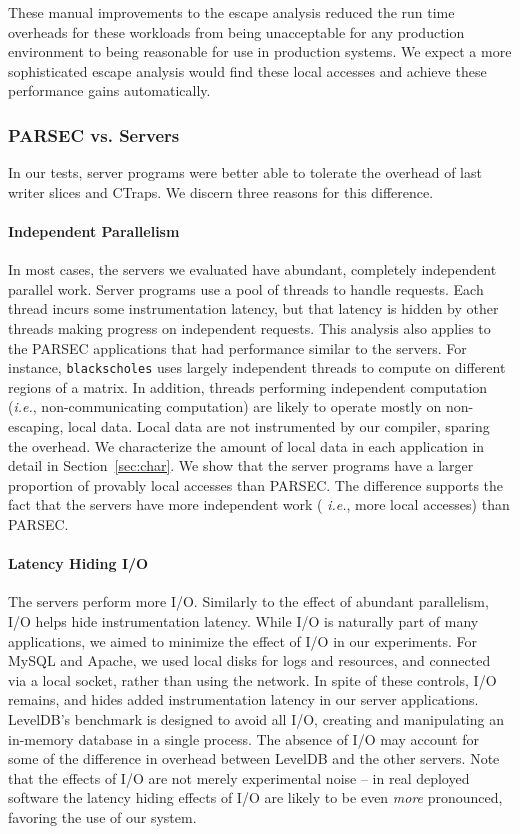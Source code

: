 \documentclass[preprint,9pt]{sigplanconf}
\newcommand{\ctraps}{CTraps\xspace}
\begin{document}
These manual improvements to the escape analysis reduced the run time overheads
for these workloads from being unacceptable for any production environment to
being reasonable for use in production systems.  We expect a more sophisticated
escape analysis would find these local accesses and achieve these performance
gains automatically.


\subsubsection{PARSEC vs. Servers}
\label{sec:eval:parsecserver}
In our tests, server programs were better able to tolerate the overhead of
last writer slices and \ctraps.   We discern three reasons for this difference.

\paragraph{Independent Parallelism}
In most cases, the servers we evaluated have abundant, completely independent
parallel work.  Server programs use a pool of threads to handle requests.
Each thread incurs some instrumentation latency, but that latency is hidden by
other threads making progress on independent requests.  This analysis also
applies to the PARSEC applications that had performance similar to the servers.
For instance, {\tt blackscholes} uses largely independent threads to compute on
different regions of a matrix.  In addition, threads performing independent
computation ({\em i.e.}, non-communicating computation) are likely to operate
mostly on non-escaping, local data.  Local data are not instrumented by our
compiler, sparing the overhead.  We characterize the amount of local data in
each application in detail in Section~\ref{sec:char}.  We show that the server
programs have a larger proportion of provably local accesses than PARSEC.  The
difference supports the fact that the servers have more independent work ({\em
i.e.}, more local accesses) than PARSEC. 


\paragraph{Latency Hiding I/O}
The servers perform more I/O.  Similarly to the effect of abundant parallelism,
I/O helps hide instrumentation latency.  While I/O is naturally part of many
applications, we aimed to minimize the effect of I/O in our experiments.  For
MySQL and Apache, we used local disks for logs and resources, and connected via
a local socket, rather than using the network.  In spite of these controls, I/O
remains, and hides added instrumentation latency in our server applications.
LevelDB's benchmark is designed to avoid all I/O, creating and manipulating an
in-memory database in a single process.  The absence of I/O may account for some
of the difference in overhead between LevelDB and the other servers.  Note that
the effects of I/O are not merely experimental noise -- in real deployed
software the latency hiding effects of I/O are likely to be even {\em more}
pronounced, favoring the use of our system.
\end{document}
